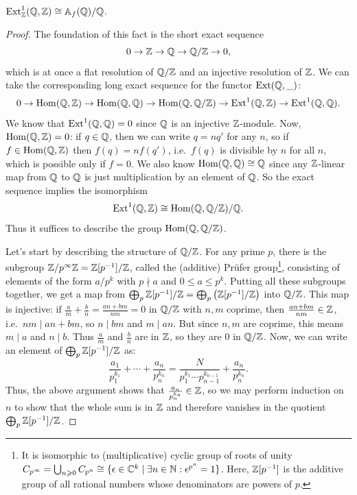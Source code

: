 \begin{thm}
    $\operatorname{Ext}_{\mathbb{Z}}^1(\mathbb{Q},\mathbb{Z})\cong \mathbb{A}_f(\mathbb{Q})\slash\mathbb{Q}$.
\end{thm}
\begin{proof}
    The foundation of this fact is the short exact sequence
    \[0\to \mathbb{Z}\to \mathbb{Q}\to \mathbb{Q}\slash\mathbb{Z}\to 0,\]
    which is at once a flat resolution of $\mathbb{Q}\slash\mathbb{Z}$ and an injective resolution of $\mathbb{Z}$. We can take the corresponding long exact sequence for the functor $\operatorname{Ext}(\mathbb{Q},\_)$:
    \[0\to \operatorname{Hom}(\mathbb{Q},\mathbb{Z})\to \operatorname{Hom}(\mathbb{Q},\mathbb{Q})\to \operatorname{Hom}(\mathbb{Q},\mathbb{Q}\slash \mathbb{Z})\to \operatorname{Ext}^1(\mathbb{Q},\mathbb{Z})\to \operatorname{Ext}^1(\mathbb{Q},\mathbb{Q}).\]
    We know that $\operatorname{Ext}^1(\mathbb{Q},\mathbb{Q})=0$ since $\mathbb{Q}$ is an injective $\mathbb{Z}$-module. Now, $\operatorname{Hom}(\mathbb{Q},\mathbb{Z})=0$: if $q\in \mathbb{Q}$, then we can write $q=nq'$ for any $n$, so if $f\in\operatorname{Hom}(\mathbb{Q},\mathbb{Z})$ then $f(q)=nf(q')$, i.e.~$f(q)$ is divisible by $n$ for all $n$, which is possible only if $f=0$. We also know $\operatorname{Hom}(\mathbb{Q},\mathbb{Q})\cong\mathbb{Q}$ since any $\mathbb{Z}$-linear map from $\mathbb{Q}$ to $\mathbb{Q}$ is just multiplication by an element of $\mathbb{Q}$. So the exact sequence implies the isomorphism
    \[\operatorname{Ext}^1(\mathbb{Q},\mathbb{Z})\cong \operatorname{Hom}(\mathbb{Q},\mathbb{Q}\slash \mathbb{Z})\slash \mathbb{Q}.\]
    Thus it suffices to describe the group $\operatorname{Hom}(\mathbb{Q},\mathbb{Q}\slash \mathbb{Z})$.

    Let's start by describing the structure of $\mathbb{Q}\slash\mathbb{Z}$. For any prime $p$, there is the subgroup $\mathbb{Z}\slash p^\infty\mathbb{Z}=\mathbb{Z}[p^{-1}]\slash\mathbb{Z}$, called the (additive) Pr\"ufer group\footnote{It is isomorphic to (multiplicative) cyclic group of roots of unity $C_{p^\infty}=\bigcup_{n\geqslant 0}C_{p^n}\cong\{\epsilon\in\mathbb{C}^k\mid \exists n\in\mathbb{N}: \epsilon^{p^n}=1\}$. Here, $\mathbb{Z}[p^{-1}]$ is the additive group of all rational numbers whose denominators are powers of $p$.}, consisting of elements of the form $a/p^k$ with $p\nmid a$ and $0\leq a\leq p^k$. Putting all these subgroups together, we get a map from $\bigoplus_p\mathbb{Z}[p^{-1}]\slash\mathbb{Z}=\bigoplus_p\left(\mathbb{Z}[p^{-1}]\slash\mathbb{Z}\right)$ into $\mathbb{Q}\slash\mathbb{Z}$. This map is injective: if $\frac am+\frac bn=\frac{an+bm}{nm}=0$ in $\mathbb{Q}\slash\mathbb{Z}$ with $n,m$ coprime, then $\frac{an+bm}{nm}\in\mathbb{Z}$, i.e.~$nm\mid an+bm$, so $n\mid bm$ and $m\mid an$. But since $n,m$ are coprime, this means $m\mid a$ and $n\mid b$. Thus $\frac am$ and $\frac bn$ are in $\mathbb{Z}$, so they are $0$ in $\mathbb{Q}\slash\mathbb{Z}$. Now, we can write an element of $\bigoplus_p\mathbb{Z}[p^{-1}]\slash\mathbb{Z}$ as:
    \[\frac{a_1}{p_1^{k_1}}+\cdots +\frac{a_n}{p_n^{k_n}}=\frac{N}{p_1^{k_1}\cdots p_{n-1}^{k_{n-1}}}+\frac{a_n}{p_n^{k_n}}.\]
    Thus, the above argument shows that $\frac{a_n}{p_n^{k_n}}\in\mathbb{Z}$, so we may perform induction on $n$ to show that the whole sum is in $\mathbb{Z}$ and therefore vanishes in the quotient $\bigoplus_p\mathbb{Z}[p^{-1}]\slash\mathbb{Z}$.


\end{proof}
